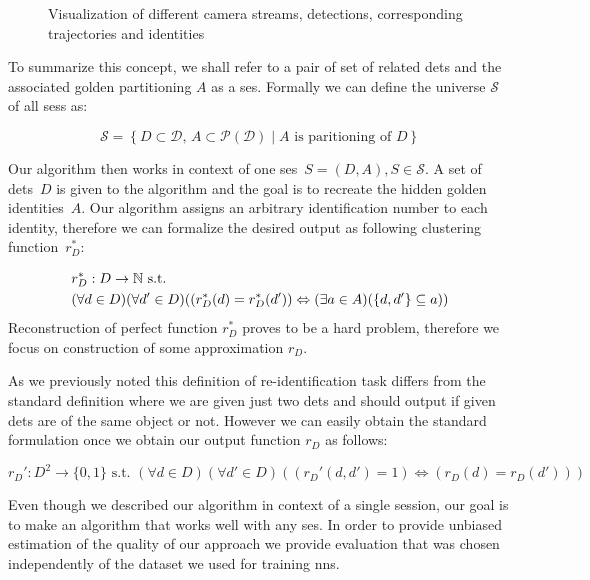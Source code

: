 \begin{figure}
    \centering
    \def\svgwidth{\textwidth}
    
    \caption{Visualization of different camera streams, detections, corresponding trajectories and identities}
    \label{fig:structure_schema}
\end{figure}



To summarize this concept, we shall refer to a pair of set of related \glspl{det} and the associated golden partitioning $A$ as a \gls{ses}. Formally we can define the universe $\mathcal{S}$ of all \glspl{ses} as:

\begin{equation*}
    \mathcal{S} = \left\{D \subset \mathcal{D},\,A \subset \mathcal{P(D)} \mid A\text{ is paritioning of }D \right\}
\end{equation*}

Our algorithm then works in context of one \gls{ses}~$S = (D, A), S \in \mathcal{S}$. A set of \glspl{det}~$D$ is given to the  algorithm and the goal is to recreate the hidden golden identities~$A$. Our algorithm assigns an arbitrary identification number to each identity, therefore we can formalize the desired output as following clustering function~$r_D^*$:

\begin{equation}
\begin{split}
&r_D^*: D \rightarrow \mathbb{N} \text{ s.t. }\\
&(\forall d \in D) (\forall d' \in D) ((r_D^*(d) = r_D^*(d')) \Leftrightarrow (\exists a \in A) (\{d, d'\} \subseteq a))
\label{eq:reidentification}
\end{split}
\end{equation}
Reconstruction of perfect function $r_D^*$ proves to be a hard problem, 
therefore we focus on construction of some approximation $r_D$.

As we previously noted this definition of re-identification task differs from the standard definition where we are given just two \glspl{det} and should output if given \glspl{det} are of the same object or not. However we can easily obtain the standard formulation once we obtain our output function $r_D$ as follows:

$$
r_D' : D^2 \to \{0, 1\} \text{ s.t. } (\forall d \in D) (\forall d' \in D) ((r_D'(d, d') = 1) \Leftrightarrow (r_D(d) = r_D(d')))
$$

Even though we described our algorithm in context of a single session, our goal is to make an algorithm that works well with any \gls{ses}. In order to provide unbiased estimation of the quality of our approach we provide evaluation that was chosen independently of the dataset we used for training \glspl{nn}.

